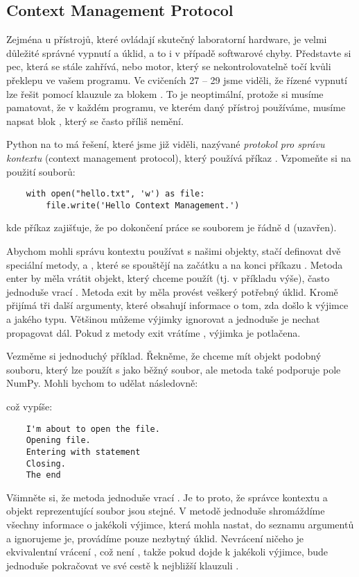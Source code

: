 \subsection{Context Management Protocol}
Zejména u přístrojů, které ovládají skutečný laboratorní hardware, je velmi důležité správné vypnutí a úklid, a to i v případě softwarové chyby. Představte si pec, která se stále zahřívá, nebo motor, který se nekontrolovatelně točí kvůli překlepu ve vašem programu. Ve cvičeních 27 -- 29 jsme viděli, že řízené vypnutí lze řešit pomocí klauzule  za blokem . To je neoptimální, protože si musíme pamatovat, že v každém programu, ve kterém daný přístroj používáme, musíme napsat blok , který se často příliš nemění.

Python na to má řešení, které jsme již viděli, nazývané \emph{protokol pro správu kontextu} (context management protocol), který používá příkaz . Vzpomeňte si na použití souborů:
\begin{lstlisting}
    with open("hello.txt", 'w') as file:
        file.write('Hello Context Management.')
\end{lstlisting}
kde příkaz  zajišťuje, že po dokončení práce se souborem je řádně d (uzavřen).

Abychom mohli správu kontextu používat s našimi objekty, stačí definovat dvě speciální metody,  a , které se spouštějí na začátku a na konci příkazu . Metoda enter by měla vrátit objekt, který chceme použít (tj.  v příkladu výše), často jednoduše vrací . Metoda exit by měla provést veškerý potřebný úklid. Kromě  přijímá tři další argumenty, které obsahují informace o tom, zda došlo k výjimce a jakého typu. Většinou můžeme výjimky ignorovat a jednoduše je nechat propagovat dál. Pokud z metody exit vrátíme , výjimka je potlačena.

Vezměme si jednoduchý příklad. Řekněme, že chceme mít objekt podobný souboru, který lze použít s  jako běžný soubor, ale metoda  také podporuje pole NumPy. Mohli bychom to udělat následovně:

což vypíše:
\begin{verbatim}
    I'm about to open the file.
    Opening file.
    Entering with statement
    Closing.
    The end
\end{verbatim}

Všimněte si, že metoda  jednoduše vrací . Je to proto, že správce kontextu a objekt reprezentující soubor jsou stejné. V metodě  jednoduše shromáždíme všechny informace o jakékoli výjimce, která mohla nastat, do seznamu argumentů  a ignorujeme je, provádíme pouze nezbytný úklid. Nevrácení ničeho je ekvivalentní vrácení , což není , takže pokud dojde k jakékoli výjimce, bude jednoduše pokračovat ve své cestě k nejbližší klauzuli .

